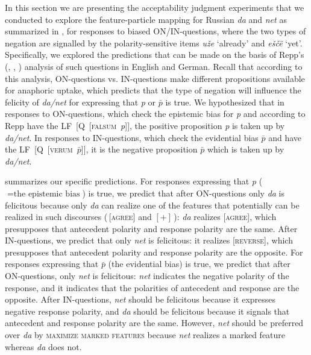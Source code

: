 \documentclass[output=paper,colorlinks,citecolor=brown]{langscibook}
\begin{document}
In this section we are presenting the acceptability judgment experiments that we conducted to explore the feature-particle mapping for Russian \textit{da} and \textit{net} as summarized in , for responses to biased ON/IN-questions, where the two types of negation are signalled by the polarity-sensitive items \textit{uže} ‘already’ and \textit{eščë} ‘yet’. Specifically, we explored the predictions that can be made on the basis of Repp’s (\citeyear{Repp2006}, \citeyear{Repp2009}, \citeyear{Repp2013}) analysis of such questions in English and German. Recall that according to this analysis, ON-questions vs. IN-questions make different propositions available for anaphoric uptake, which predicts that the type of negation will influence the felicity of \textit{da/net} for expressing that \textit{p} or $\bar{p}$ is true. We hypothesized that in responses to ON-questions, which check the epistemic bias for \textit{p} and according to Repp have the LF~[Q~[\textsc{falsum}~\textit{p}]], the positive proposition \textit{p} is taken up by \textit{da/net}. In responses to IN-questions, which check the evidential bias $\bar{p}$ and have the LF~[Q~[\textsc{verum}~$\bar{p}$]], it is the negative proposition $\bar{p}$ which is taken up by \textit{da/net}. 

 summarizes our specific predictions. For responses expressing that \textit{p} ($=\text{the epistemic bias}$) is true, we predict that after ON-questions only \textit{da} is felicitous because only \textit{da} can realize one of the features that potentially can be realized in such discourses (\,[\textsc{agree}] and $[+]$\,): \textit{da} realizes [\textsc{agree}], which presupposes that antecedent polarity and response polarity are the same. After IN-questions, we predict that only \textit{net} is felicitous: it realizes [\textsc{reverse}], which presupposes that antecedent polarity and response polarity are the opposite. For responses expressing that $\bar{p}$ (the evidential bias) is true, we predict that after ON-questions, only \textit{net} is felicitous: \textit{net} indicates the negative polarity of the response, and it indicates that the polarities of antecedent and response are the opposite. After IN-questions, \textit{net} should be felicitous because it expresses negative response polarity, and \textit{da} should be felicitous because it signals that antecedent and response polarity are the same. However, \textit{net} should be preferred over \textit{da} by \textsc{maximize marked features} because \textit{net} realizes a marked feature whereas \textit{da} does not.
\end{document}
